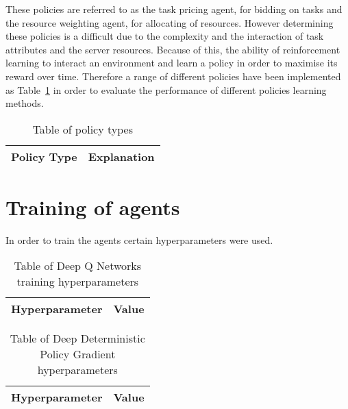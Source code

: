 These policies are referred to as the task pricing agent, for bidding on tasks and the resource weighting agent,
for allocating of resources. However determining these policies is a difficult due to the complexity and the interaction
of task attributes and the server resources. Because of this, the ability of reinforcement learning to interact
an environment and learn a policy in order to maximise its reward over time. Therefore a range of different
policies have been implemented as Table~\ref{tab:policies} in order to evaluate the performance of different policies
learning methods.

\begin{table}
    \centering
    \begin{tabular}{l|l} \hline
        Policy Type & Explanation \\ \hline
    \end{tabular}
    \caption{Table of policy types}
    \label{tab:policies}
\end{table}


\section{Training of agents}\label{sec:training-of-agents}
In order to train the agents certain hyperparameters were used.

\begin{table}
    \begin{tabular}{l|l} \hline
        Hyperparameter & Value \\ \hline
    \end{tabular}
    \label{tab:dqn_hyperparameter}
    \caption{Table of Deep Q Networks training hyperparameters}
\end{table}

\begin{table}
    \begin{tabular}{l|l} \hline
        Hyperparameter & Value \\ \hline
    \end{tabular}
    \label{tab:ddpg_hyperparameter}
    \caption{Table of Deep Deterministic Policy Gradient hyperparameters}
\end{table}
